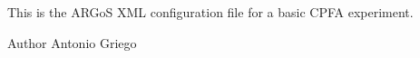 This is the A\+R\+Go\+S X\+M\+L configuration file for a basic C\+P\+F\+A experiment. \begin{DoxyAuthor}{Author}
Antonio Griego 
\end{DoxyAuthor}
